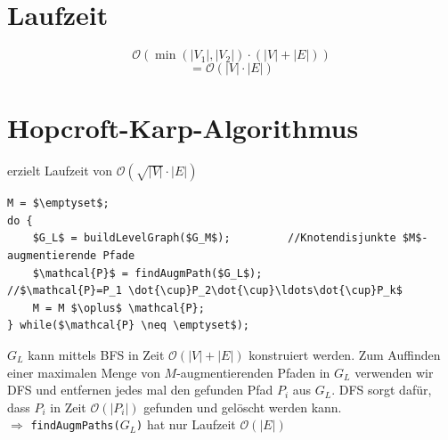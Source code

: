  \section{Laufzeit}
 \[ \mathcal{O}\left( \min(|V_1|,|V_2|)\cdot(|V|+|E|) \right)\]
 \[ =\mathcal{O}(|V|\cdot|E|) \]
 \section{Hopcroft-Karp-Algorithmus}
 erzielt Laufzeit von $\mathcal{O}(\sqrt{|V|}\cdot |E|)$\\
 \begin{lstlisting}
M = $\emptyset$;
do {
	$G_L$ = buildLevelGraph($G_M$);			//Knotendisjunkte $M$-augmentierende Pfade
	$\mathcal{P}$ = findAugmPath($G_L$);				//$\mathcal{P}=P_1 \dot{\cup}P_2\dot{\cup}\ldots\dot{\cup}P_k$
	M = M $\oplus$ \mathcal{P};
} while($\mathcal{P} \neq \emptyset$);
 \end{lstlisting}
 $G_L$ kann mittels BFS in Zeit $\mathcal{O} (|V|+|E|)$ konstruiert werden. Zum Auffinden einer maximalen Menge von $M$-augmentierenden Pfaden in $G_L$ verwenden wir DFS und entfernen jedes mal den gefunden Pfad $P_i$ aus $G_L$. DFS sorgt dafür, dass $P_i$ in Zeit $\mathcal{O}(|P_i|)$ gefunden und gelöscht werden kann.\\
 $\Rightarrow$ \texttt{findAugmPaths($G_L$)} hat nur Laufzeit $\mathcal{O}(|E|)$